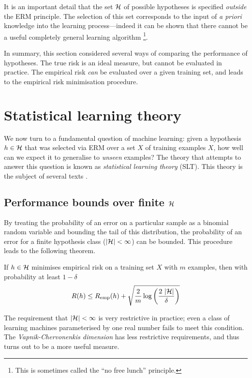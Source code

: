 It is an important detail that the set $\mathcal{H}$ of possible hypotheses
is specified \emph{outside} the ERM principle.  The selection of this
set corresponds to the input of \emph{a priori} knowledge into the
learning process---indeed it can be shown that there cannot be a
useful completely general learning algorithm%
\footnote{This is sometimes called the ``no free lunch''
principle.}. 

In summary, this section considered several ways of comparing the
performance of hypotheses.  The true risk is an ideal measure, but cannot be
evaluated in practice.  The empirical risk \emph{can} be evaluated over a
given training set, and leads to the empirical risk minimisation
procedure.

\section{Statistical learning theory}
\label{sec:slt}
\label{acr:slt}

We now turn to a fundamental question of machine learning: given a
hypothesis $h \in \mathcal{H}$ that was selected via ERM over a set $X$ of
training examples $X$, how well can we expect it to generalise to 
\emph{unseen} examples?  The theory that attempts to answer this
question is known as \emph{statistical learning theory} (SLT).  This
theory is the subject of several texts \cite{Vapnik98, Cherkassky98,
Bartlett98a}. 

\subsection{Performance bounds over finite $\mathcal{H}$}

By treating the probability of an error on a particular sample as a
binomial random variable and bounding the tail of this distribution,
the probability of an error for a finite hypothesis class ($|\mathcal{H}| <
\infty$) can be bounded.  This procedure leads to the following theorem.

\begin{theorem}
If $h \in \mathcal{H}$ minimises empirical risk on a training set $X$
with $m$ examples, then with probability at least $1 - \delta$
%
\begin{equation}
R(h) \leq R_{\mathrm{emp}}(h) + \sqrt{\frac{2}{m}
\log \left( \frac{2\  |\mathcal{H}|}{\delta} \right)}
\end{equation}
\end{theorem}

The requirement that $|\mathcal{H}| < \infty$ is very restrictive in
practice; even a class of learning machines parameterised by one real
number fails to meet this condition.  The \emph{Vapnik-Chervonenkis
dimension} has less restrictive requirements, and thus turns out to be
a more useful measure.

